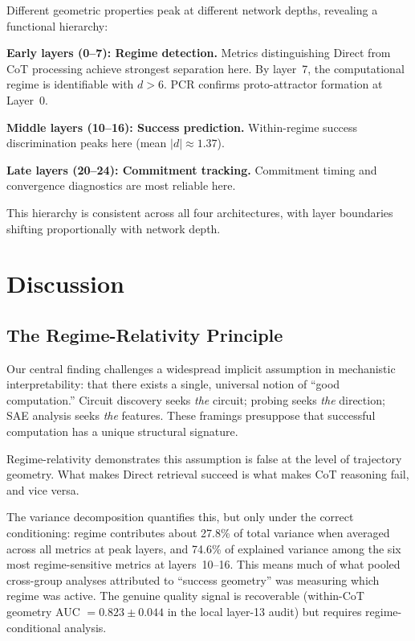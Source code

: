 \documentclass[11pt,twocolumn]{article}
\begin{document}
Different geometric properties peak at different network depths, revealing a functional hierarchy:

\textbf{Early layers (0--7): Regime detection.} Metrics distinguishing Direct from CoT processing achieve strongest separation here. By layer~7, the computational regime is identifiable with $d > 6$. PCR confirms proto-attractor formation at Layer~0.

\textbf{Middle layers (10--16): Success prediction.} Within-regime success discrimination peaks here (mean $|d| \approx 1.37$).

\textbf{Late layers (20--24): Commitment tracking.} Commitment timing and convergence diagnostics are most reliable here.

This hierarchy is consistent across all four architectures, with layer boundaries shifting proportionally with network depth.


\section{Discussion}
\label{sec:discussion}

\subsection{The Regime-Relativity Principle}

Our central finding challenges a widespread implicit assumption in mechanistic interpretability: that there exists a single, universal notion of ``good computation.'' Circuit discovery seeks \emph{the} circuit; probing seeks \emph{the} direction; SAE analysis seeks \emph{the} features. These framings presuppose that successful computation has a unique structural signature.

Regime-relativity demonstrates this assumption is false at the level of trajectory geometry. What makes Direct retrieval succeed is what makes CoT reasoning fail, and vice versa.

The variance decomposition quantifies this, but only under the correct conditioning: regime contributes about 27.8\% of total variance when averaged across all metrics at peak layers, and 74.6\% of explained variance among the six most regime-sensitive metrics at layers~10--16. This means much of what pooled cross-group analyses attributed to ``success geometry'' was measuring which regime was active. The genuine quality signal is recoverable (within-CoT geometry AUC $= 0.823 \pm 0.044$ in the local layer-13 audit) but requires regime-conditional analysis.
\end{document}
